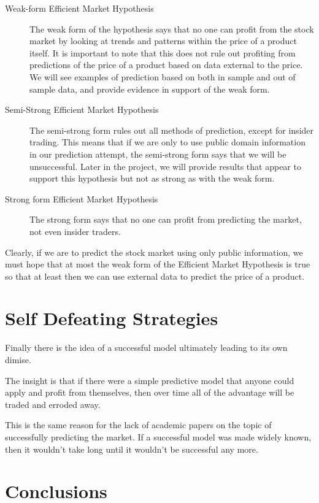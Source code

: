 \documentclass{report}
\begin{document}
\begin{description}
  \item[Weak-form Efficient Market Hypothesis] 
  The weak form of the hypothesis says that no one can profit from the stock market by looking at trends and patterns within the price of a product itself. It is important to note that this does not rule out profiting from predictions of the price of a product based on data external to the price. We will see examples of prediction based on both in sample and out of sample data, and provide evidence in support of the weak form.
  
  \item[Semi-Strong Efficient Market Hypothesis]
  The semi-strong form rules out all methods of prediction, except for insider trading. This means that if we are only to use public domain information in our prediction attempt, the semi-strong form says that we will be unsuccessful. Later in the project, we will provide results that appear to support this hypothesis but not as strong as with the weak form.
  
  \item[Strong form Efficient Market Hypothesis]
  The strong form says that no one can profit from predicting the market, not even insider traders.
\end{description}


Clearly, if we are to predict the stock market using only public information, we must hope that at most the weak form of the Efficient Market Hypothesis is true so that at least then we can use external data to predict the price of a product.

\section{Self Defeating Strategies}

Finally there is the idea of a successful model ultimately leading to its own dimise. 

The insight is that if there were a simple predictive model that anyone could apply and profit from themselves, then over time all of the advantage will be traded and erroded away.

This is the same reason for the lack of academic papers on the topic of successfully predicting the market. If a successful model was made widely known, then it wouldn't take long until it wouldn't be successful any more.

\section{Conclusions}
\end{document}

